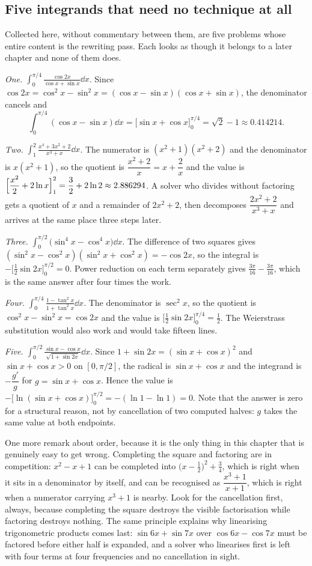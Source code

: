 \subsection{Five integrands that need no technique at all}

Collected here, without commentary between them, are five problems whose entire content is the rewriting pass. Each looks as though it belongs to a later chapter and none of them does.

\emph{One.} $\displaystyle\int_0^{\pi/4}\frac{\cos2x}{\cos x+\sin x}\dd x$. Since $\cos2x=\cos^2x-\sin^2x=(\cos x-\sin x)(\cos x+\sin x)$, the denominator cancels and
\[
\int_0^{\pi/4}(\cos x-\sin x)\dd x=\bigl[\sin x+\cos x\bigr]_0^{\pi/4}=\sqrt2-1\approx0.414214 .
\]

\emph{Two.} $\displaystyle\int_1^2\frac{x^4+3x^2+2}{x^3+x}\dd x$. The numerator is $(x^2+1)(x^2+2)$ and the denominator is $x(x^2+1)$, so the quotient is $\dfrac{x^2+2}{x}=x+\dfrac2x$ and the value is $\Bigl[\dfrac{x^2}{2}+2\ln x\Bigr]_1^2=\dfrac32+2\ln2\approx2.886294$. A solver who divides without factoring gets a quotient of $x$ and a remainder of $2x^2+2$, then decomposes $\dfrac{2x^2+2}{x^3+x}$ and arrives at the same place three steps later.

\emph{Three.} $\displaystyle\int_0^{\pi/2}\bigl(\sin^4x-\cos^4x\bigr)\dd x$. The difference of two squares gives $(\sin^2x-\cos^2x)(\sin^2x+\cos^2x)=-\cos2x$, so the integral is $-\bigl[\tfrac12\sin2x\bigr]_0^{\pi/2}=0$. Power reduction on each term separately gives $\tfrac{3\pi}{16}-\tfrac{3\pi}{16}$, which is the same answer after four times the work.

\emph{Four.} $\displaystyle\int_0^{\pi/4}\frac{1-\tan^2x}{1+\tan^2x}\dd x$. The denominator is $\sec^2x$, so the quotient is $\cos^2x-\sin^2x=\cos2x$ and the value is $\bigl[\tfrac12\sin2x\bigr]_0^{\pi/4}=\tfrac12$. The Weierstrass substitution would also work and would take fifteen lines.

\emph{Five.} $\displaystyle\int_0^{\pi/2}\frac{\sin x-\cos x}{\sqrt{1+\sin2x}}\dd x$. Since $1+\sin2x=(\sin x+\cos x)^2$ and $\sin x+\cos x>0$ on $[0,\pi/2]$, the radical is $\sin x+\cos x$ and the integrand is $-\dfrac{g'}{g}$ for $g=\sin x+\cos x$. Hence the value is $-\bigl[\ln(\sin x+\cos x)\bigr]_0^{\pi/2}=-(\ln1-\ln1)=0$. Note that the answer is zero for a structural reason, not by cancellation of two computed halves: $g$ takes the same value at both endpoints.

One more remark about order, because it is the only thing in this chapter that is genuinely easy to get wrong. Completing the square and factoring are in competition: $x^2-x+1$ can be completed into $\bigl(x-\tfrac12\bigr)^2+\tfrac34$, which is right when it sits in a denominator by itself, and can be recognised as $\dfrac{x^3+1}{x+1}$, which is right when a numerator carrying $x^3+1$ is nearby. Look for the cancellation first, always, because completing the square destroys the visible factorisation while factoring destroys nothing. The same principle explains why linearising trigonometric products comes last: $\sin6x+\sin7x$ over $\cos6x-\cos7x$ must be factored before either half is expanded, and a solver who linearises first is left with four terms at four frequencies and no cancellation in sight.

